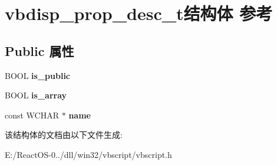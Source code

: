 \hypertarget{structvbdisp__prop__desc__t}{}\section{vbdisp\+\_\+prop\+\_\+desc\+\_\+t结构体 参考}
\label{structvbdisp__prop__desc__t}
\subsection*{Public 属性}
\begin{DoxyCompactItemize}
\item 
\mbox{\label{structvbdisp__prop__desc__t_a26064b31e86d109138dc0daec211c86c}} 
B\+O\+OL {\bfseries is\+\_\+public}
\item 
\mbox{\label{structvbdisp__prop__desc__t_a562e48d3458a0484b9b6247efe399522}} 
B\+O\+OL {\bfseries is\+\_\+array}
\item 
\mbox{\label{structvbdisp__prop__desc__t_a16a79a3b435512627d8f86d1e81e3d1b}} 
const W\+C\+H\+AR $\ast$ {\bfseries name}
\end{DoxyCompactItemize}


该结构体的文档由以下文件生成\+:\begin{DoxyCompactItemize}
\item 
E\+:/\+React\+O\+S-\/0../dll/win32/vbscript/vbscript.\+h\end{DoxyCompactItemize}
